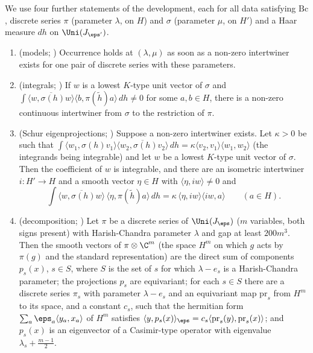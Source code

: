 We use four further statements of the development, each for all data satisfying $\mathrm{Bc}$, discrete series $\pi$ (parameter $\lambda$, on
$H$) and $\sigma$ (parameter $\mu$, on $H'$) and a Haar measure $dh$ on $\Uni(J_{\eps'})$.
\begin{enumerate}[label=(W\arabic*)]
\item\label{pf:fs:W1} (models; ) Occurrence holds at $(\lambda,\mu)$ as soon as a non-zero
intertwiner exists for one pair of discrete series with these parameters.
\item\label{pf:fs:W2} (integrals; ) If $w$ is a lowest $K$-type unit vector of $\sigma$ and
$\int\overline{\langle w,\sigma(h)w\rangle}\langle b,\pi(\tilde h)a\rangle\,dh\ne0$ for some $a,b\in H$, there is a non-zero continuous intertwiner from
$\sigma$ to the restriction of $\pi$.
\item\label{pf:fs:W3} (Schur eigenprojections; ) Suppose a non-zero intertwiner exists.
Let $\kappa>0$ be such that $\int\langle w_1,\sigma(h)v_1\rangle\overline{\langle w_2,\sigma(h)v_2\rangle}\,dh=\kappa\langle v_2,v_1\rangle\langle w_1,w_2\rangle$
(the integrands being integrable) and let $w$ be a lowest $K$-type unit vector of $\sigma$. Then the coefficient of $w$ is integrable, and there
are an isometric intertwiner $i\colon H'\to H$ and a smooth vector $\eta\in H$ with $\langle\eta,iw\rangle\ne0$ and
\begin{equation}\label{eq:pf:fs:eigproj}
\int\overline{\langle w,\sigma(h)w\rangle}\,\langle\eta,\pi(\tilde h)a\rangle\,dh=\kappa\,\langle\eta,iw\rangle\langle iw,a\rangle\qquad(a\in H).
\end{equation}
\item\label{pf:fs:W4} (decomposition; ) Let $\pi$ be a discrete series of
$\Uni(J_\eps)$ ($m$ variables, both signs present) with Harish-Chandra parameter $\lambda$ and gap at least $200m^3$. Then the smooth vectors of
$\pi\otimes\C^m$ (the space $H^m$ on which $g$ acts by $\pi(g)$ and the standard representation) are the direct sum of components $p_s(x)$,
$s\in S$, where $S$ is the set of $s$ for which $\lambda-e_s$ is a Harish-Chandra parameter; the projections $p_s$ are equivariant; for each
$s\in S$ there are a discrete series $\pi_s$ with parameter $\lambda-e_s$ and an equivariant map $\mathrm{pr}_s$ from $H^m$ to its space, and a
constant $c_s$, such that the hermitian form $\sum_a\eps_a\langle y_a,x_a\rangle$ of $H^m$ satisfies
$\langle y,p_s(x)\rangle_\eps=c_s\langle\mathrm{pr}_s(y),\mathrm{pr}_s(x)\rangle$; and $p_s(x)$ is an eigenvector of a Casimir-type operator with eigenvalue
$\lambda_s+\frac{m-1}2$.
\end{enumerate}

